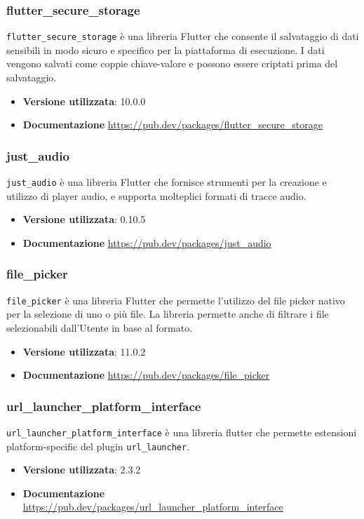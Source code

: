 \documentclass[a4paper,12pt]{article}
\begin{document}
\subsubsection{flutter\_secure\_storage}
\texttt{flutter\_secure\_storage} è una libreria Flutter che consente il salvataggio di dati sensibili in modo sicuro e specifico per la piattaforma di esecuzione. I dati vengono salvati come coppie chiave-valore e possono essere criptati prima del salvataggio.
\begin{itemize}
    \item \textbf{Versione utilizzata}: 10.0.0
    \item \textbf{Documentazione} \url{https://pub.dev/packages/flutter_secure_storage}
\end{itemize}

\subsubsection{just\_audio}
\texttt{just\_audio} è una libreria Flutter che fornisce strumenti per la creazione e utilizzo di player audio, e supporta molteplici formati di tracce audio.
\begin{itemize}
    \item \textbf{Versione utilizzata}: 0.10.5
    \item \textbf{Documentazione} \url{https://pub.dev/packages/just_audio}
\end{itemize}

\subsubsection{file\_picker}
\texttt{file\_picker} è una libreria Flutter che permette l'utilizzo del file picker nativo per la selezione di uno o più file. La libreria permette anche di filtrare i file selezionabili dall'Utente in base al formato.
\begin{itemize}
    \item \textbf{Versione utilizzata}: 11.0.2
    \item \textbf{Documentazione} \url{https://pub.dev/packages/file_picker}
\end{itemize}

\subsubsection{url\_launcher\_platform\_interface}
\texttt{url\_launcher\_platform\_interface} è una libreria flutter che permette estensioni platform-specific del plugin \texttt{url\_launcher}.
\begin{itemize}
    \item \textbf{Versione utilizzata}: 2.3.2
    \item \textbf{Documentazione} \url{https://pub.dev/packages/url_launcher_platform_interface}
\end{itemize}
\end{document}

